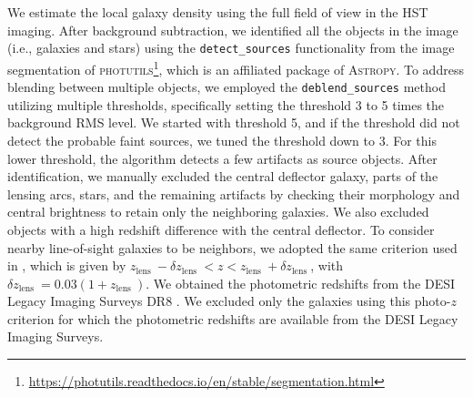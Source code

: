 \documentclass{aa}
\begin{document}
We estimate the local galaxy density using the full field of view in the HST imaging. After background subtraction, we identified all the objects in the image (i.e., galaxies and stars) using the \texttt{detect\_sources} functionality from the image segmentation of \textsc{photutils}\footnote{\url{https://photutils.readthedocs.io/en/stable/segmentation.html}}, which is an affiliated package of \textsc{Astropy}.
To address blending between multiple objects, we employed the \texttt{deblend\_sources} method utilizing multiple thresholds, specifically setting the threshold 3 to 5 times the background RMS level. %
We started with threshold 5, and if the threshold did not detect the probable faint sources, we tuned the threshold down to 3. For this lower threshold, the algorithm detects a few artifacts as source objects. After identification, we manually excluded the central deflector galaxy, parts of the lensing arcs, stars, and the remaining artifacts by checking their morphology and central brightness to retain only the neighboring galaxies. We also excluded objects with a high redshift difference with the central deflector. To consider nearby line-of-sight galaxies to be neighbors, we adopted the same criterion used in \citep{Treu09}, which is given by $z_{\text {lens }}-\delta z_{\text {lens }}<z<z_{\text {lens }}+\delta z_{\text {lens }}$, with $\delta z_{\text {lens }}=0.03\left(1+z_{\text {lens }}\right)$. We obtained the photometric redshifts from the DESI Legacy Imaging Surveys DR8 \citep{Duncan22}. We excluded only the galaxies using this photo-$z$ criterion for which the photometric redshifts are available from the DESI Legacy Imaging Surveys.
\end{document}
